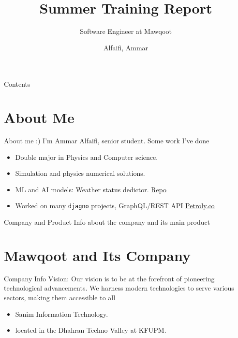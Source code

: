 \documentclass{loyola-beamer}
\title{Summer Training Report}
\subtitle{Software Engineer at Mawqoot}
\author{Alfaifi, Ammar}
\institute{KFUPM}
\begin{document}
\begin{titleframe}{}
	\maketitle
\end{titleframe}

\begin{frame}{Contents}
	\tableofcontents
\end{frame}



\section{About Me}

\begin{frame}{About me :)}
  I'm Ammar Alfaifi, senior student. Some work I've done
	\vspace{\baselineskip}

	\begin{itemize}
		\item Double major in Physics and Computer science.
		\item Simulation and physics numerical solutions.
		\item ML and AI models: Weather status dedictor. \href{https://github.com/ammar-faifi/Weather\_Status\_Predictor\_From\_Images}{\underline{Repo}}
		\item Worked on many \texttt{djagno} projects, GraphQL/REST API \href{https://Petroly.co/}{\underline{Petroly.co}}
	\end{itemize}

\end{frame}

\begin{titleframe}{Company and Product}
 Info about the company and its main product 
\end{titleframe}

\section{Mawqoot and Its Company}

\begin{frame}{Company Info}
Vision: Our vision is to be at the forefront of pioneering technological advancements. 
  We harness modern technologies to serve various sectors, making them accessible to all
	\vspace{\baselineskip}

  \begin{itemize}
    \item Sanim Information Technology.
    \item located in the Dhahran Techno Valley at KFUPM.
  \end{itemize}
\end{frame}
\end{document}
